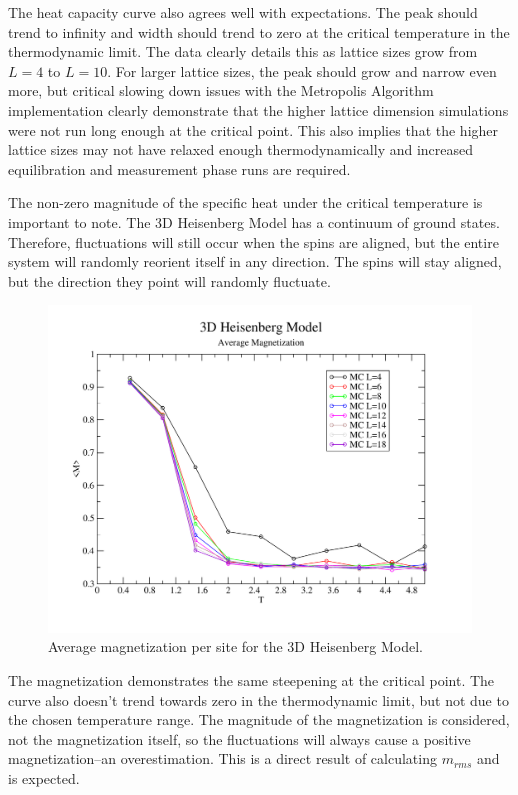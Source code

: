 \documentclass[a4paper,12pt]{article}
\begin{document}
		The heat capacity curve also agrees well with expectations. The peak should trend to infinity and width should trend to zero at the critical temperature in the thermodynamic limit. The data clearly details this as lattice sizes grow from $L = 4$ to $L = 10$. For larger lattice sizes, the peak should grow and narrow even more, but critical slowing down issues with the Metropolis Algorithm implementation clearly demonstrate that the higher lattice dimension simulations were not run long enough at the critical point. This also implies that the higher lattice sizes may not have relaxed enough thermodynamically and increased equilibration and measurement phase runs are required.

		The non-zero magnitude of the specific heat under the critical temperature is important to note. The 3D Heisenberg Model has a continuum of ground states. Therefore, fluctuations will still occur when the spins are aligned, but the entire system will randomly reorient itself in any direction. The spins will stay aligned, but the direction they point will randomly fluctuate.
		
		\begin{figure}[H]
			\centering
			\includegraphics[scale=0.65]{m_avg}
			\caption{Average magnetization per site for the 3D Heisenberg Model.}
			\label{fig:heisenberg_m_avg}
		\end{figure}

		The magnetization demonstrates the same steepening at the critical point. The curve also doesn't trend towards zero in the thermodynamic limit, but not due to the chosen temperature range. The magnitude of the magnetization is considered, not the magnetization itself, so the fluctuations will always cause a positive magnetization--an overestimation. This is a direct result of calculating $m_{rms}$ and is expected.
		
\end{document}
